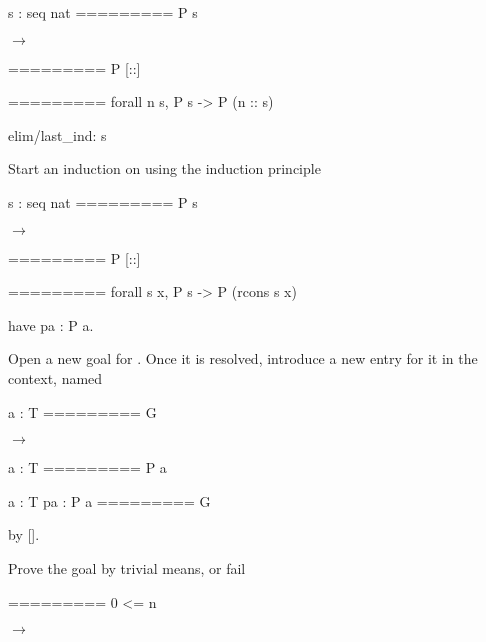 \begin{landscape}
\begin{small}
\begin{multicols*}{3}[\begin{center}\section*{}\end{center}]
\begin{cheatout}
 s : seq nat
=========
 P s
\end{cheatout}
$\to$
\begin{cheatout}
=========
 P [::]
\end{cheatout}

\noindent\hspace{0.24\textwidth}
\begin{cheatout}
=========
 forall n s,
  P s -> P (n :: s)
\end{cheatout}

\begin{cheat}
elim/last_ind: s
\end{cheat}
  Start an induction on  using the induction
  principle 

\begin{cheatout}
 s : seq nat
=========
 P s
\end{cheatout}
$\to$
\begin{cheatout}
=========
 P [::]
\end{cheatout}

\noindent\hspace{0.24\textwidth}
\begin{cheatout}
=========
 forall s x,
  P s ->
   P (rcons s x)
\end{cheatout}

\columnbreak

\begin{cheat}
have pa : P a.
\end{cheat}
  Open a new goal for . Once it is resolved,
  introduce a new entry for it in the context, named 

\begin{cheatout}
 a : T
=========
 G
\end{cheatout}
$\to$
\begin{cheatout}
 a : T
=========
 P a
\end{cheatout}

\noindent\hspace{0.24\textwidth}
\begin{cheatout}
 a : T
 pa : P a
=========
 G
\end{cheatout}

\begin{cheat}
by [].
\end{cheat}
  Prove the goal by trivial means, or fail

\begin{cheatout}
=========
 0 <= n
\end{cheatout}
$\to$
\begin{cheatout}
\end{cheatout}


\end{multicols*}
\end{small}
\end{landscape}
